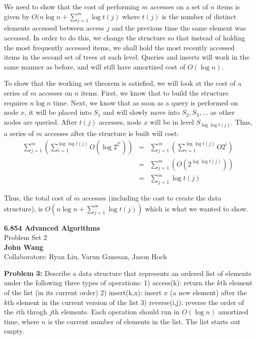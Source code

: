 \documentclass[psamsfonts]{amsart}
\newenvironment{sol}{\vspace{0.25cm}{\large \bfseries Solution:}}{\qedsymbol}
\newenvironment{prob}[1]{\begin{framed}{\large \bfseries Problem #1:}}{\end{framed}}
\newcommand{\makenewtitle}{
\begin{center}
{\huge \bfseries 6.854 Advanced Algorithms} \\
Problem Set 2\\
\vspace{0.25cm}
{\bfseries John Wang} \\
Collaborators: Ryan Liu, Varun Ganesan, Jason Hoch
\end{center}
\vspace{0.5cm}
}
\begin{document}
\begin{sol}
We need to show that the cost of performing $m$ accesses on a set of $n$ items is given by $O(n \log n + \sum_{j=1}^m \log t(j)$ where $t(j)$ is the number of distinct elements accessed between access $j$ and the previous time the same element was accessed. In order to do this, we change the structure so that instead of holding the most frequently accessed items, we shall hold the most recently accessed items in the second set of trees at each level. Queries and inserts will work in the same manner as before, and will still have amortized cost of $O(\log n)$. 

To show that the working set theorem is satisfied, we will look at the cost of a series of $m$ accesses on $n$ items. First, we know that to build the structure requires $n \log n$ time. Next, we know that as soon as a query is performed on node $x$, it will be placed into $S_1$ and will slowly move into $S_2, S_3, \ldots$ as other nodes are queried. After $t(j)$ accesses, node $x$ will be in level $S_{\log \log t(j)}$. Thus, a series of $m$ accesses after the structure is built will cost:
\begin{eqnarray}
\sum_{j=1}^m \left( \sum_{i=1}^{\log \log t(j)} O(\log 2^{2^{i}}) \right) &=& \sum_{j=1}^m \left( \sum_{i=1}^{\log \log t(j)} O{2^i} \right) \\
&=& \sum_{j=1}^m \left( O(2^{\log \log t(j)}) \right) \\
&=& \sum_{j=1}^m \log t(j)
\end{eqnarray}

Thus, the total cost of $m$ accesses (including the cost to create the data structure), is $O(n \log n + \sum_{j=1}^m \log t(j))$ which is what we wanted to show.
\end{sol}

\newpage
\makenewtitle

\begin{prob}{3}
Describe a data structure that represents an ordered list of elements under the following three types of operations: 1) access(k): return the $k$th element of the list (in its current order) 2) insert(k,x): insert $x$ (a new element) after the $k$th element in the current version of the list 3) reverse(i,j): reverse the order of the $i$th throgh $j$th elements. Each operation should run in $O(\log n)$ amortized time, where $n$ is the current number of elements in the list. The list starts out empty.
\end{prob}
\end{document}
